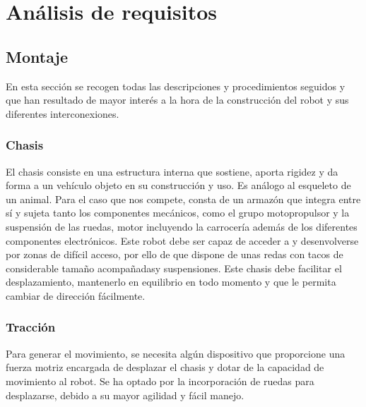 

\newpage

\chapter{Análisis de requisitos}

\label{chap:analisis_requisitos}





\section{Montaje}

En esta sección se recogen todas las descripciones y procedimientos seguidos y que han resultado de mayor interés a la hora de la construcción del robot y 
sus diferentes interconexiones.\\

\subsection{Chasis}

El chasis consiste en una estructura interna que sostiene, aporta rigidez y da forma a un vehículo objeto en su construcción y uso. Es análogo al esqueleto de un animal.
Para el caso que nos compete, consta de un armazón​ que integra entre sí y sujeta tanto los componentes mecánicos, como el grupo motopropulsor y la suspensión de las ruedas,
motor incluyendo la carrocería además de los diferentes componentes electrónicos.​ Este robot debe ser capaz de acceder a y desenvolverse por zonas de difícil acceso, por ello de que dispone de unas redas con tacos de considerable tamaño 
acompañadasy suspensiones. Este chasis debe  facilitar el  desplazamiento, mantenerlo en equilibrio en todo momento y que le permita cambiar de dirección fácilmente.

\subsection{Tracción}

Para generar el movimiento, se necesita algún dispositivo que proporcione una fuerza motriz encargada de desplazar el chasis y dotar de la capacidad de movimiento al robot.
Se ha optado por la incorporación de ruedas para desplazarse, debido a su mayor agilidad y fácil manejo.\\

